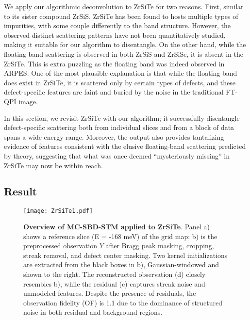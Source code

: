 We apply our algorithmic deconvolution to ZrSiTe for two reasons. First, similar to its sister compound ZrSiS, ZrSiTe has been found to hosts multiple types of impurities, with some couple differently to the band structure. However, the observed distinct scattering patterns have not been quantitatively studied, making it suitable for our algorithm to disentangle. On the other hand, while the floating band scattering is observed in both ZrSiS\cite{butlerQuasiparticleInterferenceZrSiS2017} and ZrSiSe\cite{buVisualizationElectronicTopology2018}, it is absent in the ZrSiTe\cite{stuartQuasiparticleInterferenceObservation2022}. This is extra puzzling as the floating band was indeed observed in \ac{ARPES}\cite{toppNonsymmorphicBandDegeneracy2016}. One of the most plausible explanation is that while the floating band does exist in ZrSiTe, it is scattered only by certain types of defects, and these defect-specific features are faint and buried by the noise in the traditional FT-QPI image. 

In this section, we revisit ZrSiTe with our algorithm; it successfully disentangle defect-specific scattering both from individual slices and from a block of data spans a wide energy range. Moreover, the output also provides tantalizing evidence of features consistent with the elusive floating-band scattering predicted by theory, suggesting that what was once deemed “mysteriously missing” in ZrSiTe may now be within reach.

\subsection{Result}

\begin{figure}
	\texttt{[image: ZrSiTe1.pdf]} 
	\centering
	\caption[\textbf{Overview of MC-SBD-STM applied to ZrSiTe}]{\textbf{Overview of MC-SBD-STM applied to ZrSiTe}. Panel a) shows a reference slice (E = -168 meV) of the grid map; b) is the preprocessed observation $Y$ after Bragg peak masking, cropping, streak removal, and defect center masking. Two kernel initializations are extracted from the black boxes in b), Gaussian-windowed and shown to the right. The reconstructed observation (d) closely resembles b), while the residual (c) captures streak noise and unmodeled features. Despite the presence of residuals, the observation fidelity (OF) is 1.1 due to the dominance of structured noise in both residual and background regions.}
	\label{fig:ZrSiTe1}
\end{figure}

